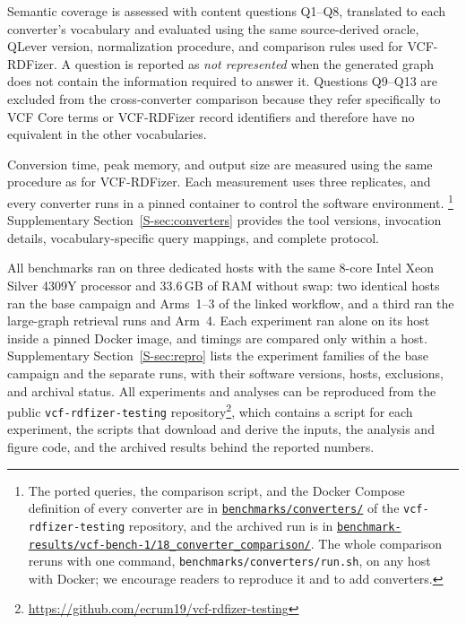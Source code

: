 \documentclass[pdflatex,sn-mathphys-num]{sn-jnl}
\begin{document}
Semantic coverage is assessed with content questions Q1--Q8, translated to each converter's vocabulary and evaluated using the same source-derived oracle, QLever version, normalization procedure, and comparison rules used for VCF-RDFizer.
A question is reported as \emph{not represented} when the generated graph does not contain the information required to answer it.
Questions Q9--Q13 are excluded from the cross-converter comparison because they refer specifically to VCF Core terms or VCF-RDFizer record identifiers and therefore have no equivalent in the other vocabularies.

Conversion time, peak memory, and output size are measured using the same procedure as for VCF-RDFizer.
Each measurement uses three replicates, and every converter runs in a pinned container to control the software environment.%
\footnote{The ported queries, the comparison script, and the Docker Compose definition of every converter are in \href{https://github.com/ecrum19/vcf-rdfizer-testing/tree/main/benchmarks/converters}{\texttt{benchmarks/converters/}} of the \texttt{vcf-rdfizer-testing} repository, and the archived run is in \href{https://github.com/ecrum19/vcf-rdfizer-testing/tree/main/BioMedSem_2026/benchmark-results/vcf-bench-1/18_converter_comparison}{\texttt{benchmark-results/vcf-bench-1/18\_converter\_comparison/}}. 
The whole comparison reruns with one command, \texttt{benchmarks/converters/run.sh}, on any host with Docker; we encourage readers to reproduce it and to add converters.}
Supplementary Section~\ref{S-sec:converters} provides the tool versions, invocation details, vocabulary-specific query mappings, and complete protocol.

All benchmarks ran on three dedicated hosts with the same 8-core Intel Xeon Silver 4309Y processor and 33.6\,GB of RAM without swap: two identical hosts ran the base campaign and Arms~1--3 of the linked workflow, and a third ran the large-graph retrieval runs and Arm~4.
Each experiment ran alone on its host inside a pinned Docker image, and timings are compared only within a host.
Supplementary Section~\ref{S-sec:repro} lists the experiment families of the base campaign and the separate runs, with their software versions, hosts, exclusions, and archival status.
All experiments and analyses can be reproduced from the public \texttt{vcf-rdfizer-testing} repository\footnote{\url{https://github.com/ecrum19/vcf-rdfizer-testing}}, which contains a script for each experiment, the scripts that download and derive the inputs, the analysis and figure code, and the archived results behind the reported numbers.
\end{document}
